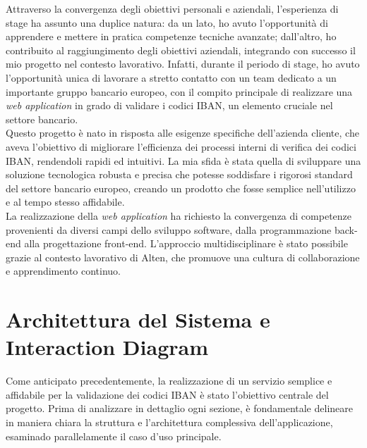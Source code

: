 Attraverso la convergenza degli obiettivi personali e aziendali, l’esperienza di stage ha assunto una duplice natura: da un lato, ho avuto l’opportunità di apprendere e mettere in pratica competenze tecniche avanzate; dall’altro, ho contribuito al raggiungimento degli obiettivi aziendali, integrando con successo il mio progetto nel contesto lavorativo. Infatti, durante il periodo di stage, ho avuto l'opportunità unica di lavorare a stretto contatto con un team dedicato a un importante gruppo bancario europeo, con il compito principale di realizzare una \textit{web application} in grado di validare i codici IBAN, un elemento cruciale nel settore bancario.\\
Questo progetto è nato in risposta alle esigenze specifiche dell'azienda cliente, che aveva l'obiettivo di migliorare l'efficienza dei processi interni di verifica dei codici IBAN, rendendoli rapidi ed intuitivi. La mia sfida è stata quella di sviluppare una soluzione tecnologica robusta e precisa che potesse soddisfare i rigorosi standard del settore bancario europeo, creando un prodotto che fosse semplice nell’utilizzo e al tempo stesso affidabile.\\
La realizzazione della \textit{web application} ha richiesto la convergenza di competenze provenienti da diversi campi dello sviluppo software, dalla programmazione back-end alla progettazione front-end. L'approccio multidisciplinare è stato possibile grazie al contesto lavorativo di Alten, che promuove una cultura di collaborazione e apprendimento continuo.

\section{Architettura del Sistema e Interaction Diagram}

Come anticipato precedentemente, la realizzazione di un servizio semplice e affidabile per la validazione dei codici IBAN è stato l’obiettivo centrale del progetto. Prima di analizzare in dettaglio ogni sezione, è fondamentale delineare in maniera chiara la struttura e l’architettura complessiva dell’applicazione, esaminado parallelamente il caso d’uso principale.

